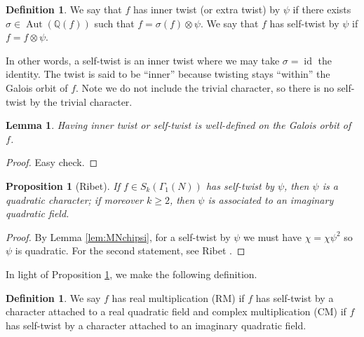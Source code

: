 \documentclass[11pt]{amsart}
\numberwithin{equation}{subsection}
\theoremstyle{plain}
\newtheorem{prop}[equation]{Proposition}
\newtheorem{lem}[equation]{Lemma}
\theoremstyle{definition}
\newtheorem{defn}[equation]{Definition}
\newcommand{\Q}{\mathbb{Q}}
\newcommand{\defi}[1]{\textsf{#1}} 	%
\DeclareMathOperator{\Aut}{Aut}
\DeclareMathOperator{\id}{id}
\begin{document}
\begin{defn}
We say that $f$ has \defi{inner twist} (or \defi{extra twist}) by $\psi$ if there exists $\sigma \in \Aut(\Q(f))$ such that $f=\sigma(f) \otimes \psi$.  We say that $f$ has \defi{self-twist} by $\psi$ if $f=f \otimes \psi$.
\end{defn}

In other words, a self-twist is an inner twist where we may take $\sigma=\id$ the identity.  The twist is said to be ``inner'' because twisting stays ``within'' the Galois orbit of $f$.  Note we do not include the trivial character, so there is no self-twist by the trivial character.  

\begin{lem}
Having inner twist or self-twist is well-defined on the Galois orbit of $f$.
\end{lem}

\begin{proof}
Easy check.
\end{proof}

\begin{prop}[Ribet] \label{prop:ribetcm}
If $f \in S_k(\Gamma_1(N))$ has self-twist by $\psi$, then $\psi$ is a quadratic character; if moreover $k \geq 2$, then $\psi$ is associated to an imaginary quadratic field.
\end{prop}

\begin{proof}
By Lemma \ref{lem:MNchipsi}, for a self-twist by $\psi$ we must have $\chi=\chi\psi^2$ so $\psi$ is quadratic.  For the second statement, see Ribet \cite[Theorem (4.5)]{Ribet:galreps}.
\end{proof}

In light of Proposition \ref{prop:ribetcm}, we make the following definition.

\begin{defn}
We say $f$ has \defi{real multiplication (RM)} if $f$ has self-twist by a character attached to a real quadratic field and \defi{complex multiplication (CM)} if $f$ has self-twist by a character attached to an imaginary quadratic field.
\end{defn}
\end{document}
